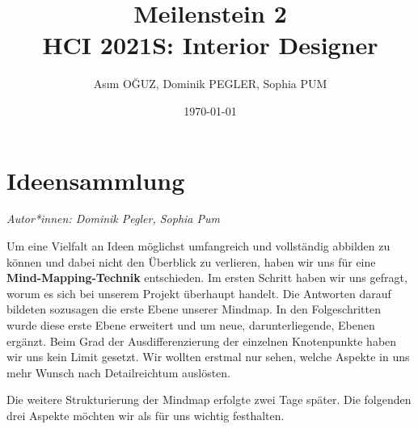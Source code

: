 \documentclass[12pt,paper=a4,oneside,hidelinks,headings=small,captions=heading,captions=nooneline]{scrartcl}
\author{Asım OĞUZ, Dominik PEGLER, Sophia PUM}
\date{\today}
\title{Meilenstein 2\\\medskip
\large HCI 2021S: Interior Designer}
\begin{document}
\maketitle
\setcounter{tocdepth}{2}
\tableofcontents\newpage

\section{Ideensammlung}
\label{sec:orgfefda62}

\emph{Autor*innen: Dominik Pegler, Sophia Pum}

Um eine Vielfalt an Ideen möglichst umfangreich und vollständig
abbilden zu können und dabei nicht den Überblick zu verlieren, haben
wir uns für eine \textbf{Mind-Mapping-Technik} entschieden. Im ersten Schritt
haben wir uns gefragt, worum es sich bei unserem Projekt überhaupt
handelt. Die Antworten darauf bildeten sozusagen die erste Ebene
unserer Mindmap. In den Folgeschritten wurde diese erste Ebene
erweitert und um neue, darunterliegende, Ebenen ergänzt. Beim Grad der
Ausdifferenzierung der einzelnen Knotenpunkte haben wir uns kein Limit
gesetzt. Wir wollten erstmal nur sehen, welche Aspekte in uns mehr
Wunsch nach Detailreichtum auslösten.

Die weitere Strukturierung der Mindmap erfolgte zwei Tage
später. Die folgenden drei Aspekte möchten wir als für uns wichtig festhalten.
\end{document}
